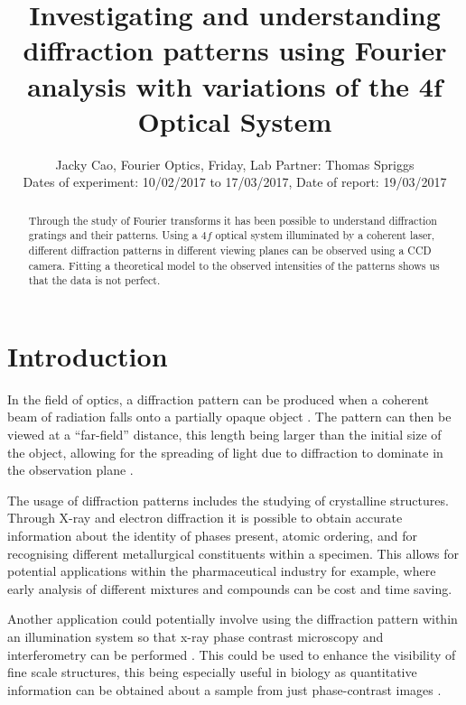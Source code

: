 \documentclass[twocolumn]{revtex4}
\begin{document}
\textheight=26.385cm

\title{Investigating and understanding diffraction patterns using Fourier analysis with variations of the $\boldsymbol{4f}$ Optical System}
 
\author{Jacky Cao, Fourier Optics, Friday, Lab Partner: Thomas Spriggs \\ Dates of experiment: 10/02/2017 to 17/03/2017, Date of report: 19/03/2017}

\begin{abstract}              
Through the study of Fourier transforms it has been possible to understand diffraction gratings and their patterns. Using a $4f$ optical system illuminated by a coherent laser, different diffraction patterns in different viewing planes can be observed using a CCD camera. Fitting a theoretical model to the observed intensities of the patterns shows us that the data is not perfect.
\end{abstract}

\maketitle

\section{Introduction} 
\vspace{-2ex} 

In the field of optics, a diffraction pattern can be produced when a coherent beam of radiation falls onto a partially opaque object \cite{mathmethods}. The pattern can then be viewed at a ``far-field'' distance, this length being larger than the initial size of the object, allowing for the spreading of light due to diffraction to dominate in the observation plane \cite{of2f}. 

The usage of diffraction patterns includes the studying of crystalline structures. Through X-ray and electron diffraction it is possible to obtain accurate information about the identity of phases present, atomic ordering, and for recognising different metallurgical constituents within a specimen. This allows for potential applications within the pharmaceutical industry for example, where early analysis of different mixtures and compounds can be cost and time saving. \cite{elecdiffraction, xraypharma}

Another application could potentially involve using the diffraction pattern within an illumination system so that x-ray phase contrast microscopy and interferometry can be performed \cite{singleslit}. This could be used to enhance the visibility of fine scale structures, this being especially useful in biology as quantitative information can be obtained about a sample from just phase-contrast images \cite{xrayphase}.
\end{document}
